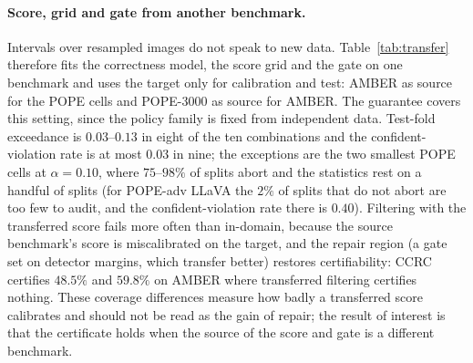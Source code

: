 \begin{table}[t]
\centering
\caption{Certified coverage (\%, abort rate in parentheses) with channel 1 restricted to the VLM's own signals and with the full score. CCRC uses the
size-matched external gate in both cases (selected with the matching score); gain is against filtering with the same score.}
\label{tab:detfree}
\small
\resizebox{\textwidth}{!}{}
\end{table}

\paragraph{Score, grid and gate from another benchmark.}
Intervals over resampled images do not speak to new data. Table~\ref{tab:transfer} therefore fits the correctness model, the score grid and the gate on one benchmark and uses
the target only for calibration and test: AMBER as source for the POPE cells and POPE-3000 as source for AMBER. The guarantee covers this setting, since
the policy family is fixed from independent data. Test-fold exceedance is $0.03$--$0.13$ in eight of the ten combinations and the confident-violation rate is at most $0.03$ in nine; the exceptions are the two smallest POPE cells at $\alpha=0.10$, where $75$--$98\%$ of splits abort and the statistics rest on a handful
of splits (for POPE-adv LLaVA the $2\%$ of splits that do not abort are too few to audit, and the confident-violation rate there is $0.40$). Filtering with the
transferred score fails more often than in-domain, because the source benchmark's score is miscalibrated on the target, and the repair region (a gate set on
detector margins, which transfer better) restores certifiability: CCRC certifies $48.5\%$ and $59.8\%$ on AMBER where transferred filtering certifies nothing. These coverage differences measure how badly a transferred score calibrates and
should not be read as the gain of repair; the result of interest is that the certificate holds when the source of the score and gate is a different benchmark.

\begin{table}[t]
\centering
\caption{Held-out benchmark. Score model, score grid and gate are fitted on the source benchmark; calibration and test folds come from the target. In-domain CCRC
is the size-matched external-gate result of Table~\ref{tab:main}. exc: test-fold exceedance of $\alpha$; cv: confident-violation rate.}
\label{tab:transfer}
\small
\resizebox{\textwidth}{!}{}
\end{table}

